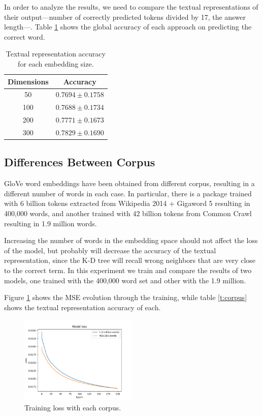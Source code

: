 \documentclass[]{article}
\begin{document}
	In order to analyze the results, we need to compare the textual representations of their output---number of correctly predicted tokens divided by 17, the answer length---. Table \ref{t:sizes} shows the global accuracy of each approach on predicting the correct word.
	
	\begin{table}[H]
		\centering
		\begin{tabular}{@{}cc@{}}
			\toprule
			Dimensions & Accuracy            \\ \midrule
			50         & $0.7694 \pm 0.1758$ \\
			100        & $0.7688 \pm 0.1734$ \\
			200        & $0.7771 \pm 0.1673$ \\
			300        & $0.7829 \pm 0.1690$ \\ \bottomrule
		\end{tabular}
		\caption{Textual representation accuracy for each embedding size.}
		\label{t:sizes}
	\end{table}
	
	\subsection{Differences Between Corpus}
	
	GloVe word embeddings have been obtained from different corpus, resulting in a different number of words in each case. In particular, there is a package trained with 6 billion tokens extracted from Wikipedia 2014 + Gigaword 5 resulting in 400,000 words, and another trained with 42 billion tokens from Common Crawl resulting in 1.9 million words.
	
	Increasing the number of words in the embedding space should not affect the loss of the model, but probably will decrease the accuracy of the textual representation, since the K-D tree will recall wrong neighbors that are very close to the correct term. In this experiment we train and compare the results of two models, one trained with the 400,000 word set and other with the 1.9 million.
	
	Figure \ref{f:corpus} shows the MSE evolution through the training, while table \ref{t:corpus} shows the textual representation accuracy of each.
	
	\begin{figure}[H]
		\centering
		\includegraphics[width=0.5\textwidth]{corpus}
		\caption{Training loss with each corpus.}
		\label{f:corpus}
	\end{figure}
	
\end{document}
